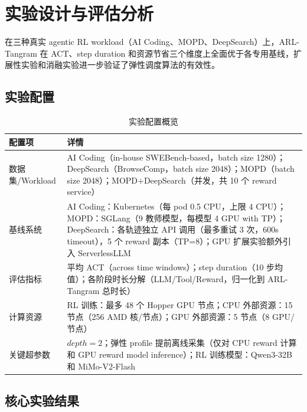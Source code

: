 \documentclass[11pt, a4paper]{article}
\begin{document}
\section{实验设计与评估分析}

\begin{keyinsight}[TL;DR]
在三种真实 agentic RL workload（AI Coding、MOPD、DeepSearch）上，ARL-Tangram 在 ACT、step duration 和资源节省三个维度上全面优于各专用基线，扩展性实验和消融实验进一步验证了弹性调度算法的有效性。
\end{keyinsight}

\subsection{实验配置}

\begin{table}[htbp]
\centering
\caption{实验配置概览}
\label{tab:expsetup}
\begin{tabular}{p{3.0cm}p{10.0cm}}
\toprule
\textbf{配置项} & \textbf{详情} \\
\midrule
数据集/Workload & AI Coding（in-house SWEBench-based，batch size 1280）；DeepSearch（BrowseComp，batch size 2048）；MOPD（batch size 2048）；MOPD+DeepSearch（并发，共 10 个 reward service） \\
基线系统 & AI Coding：Kubernetes（每 pod 0.5 CPU，上限 4 CPU）；MOPD：SGLang（9 教师模型，每模型 4 GPU with TP）；DeepSearch：各轨迹独立 API 调用（最多重试 3 次，600s timeout），5 个 reward 副本（TP=8）；GPU 扩展实验额外引入 ServerlessLLM \\
评估指标 & 平均 ACT（across time windows）；step duration（10 步均值）；各阶段时长分解（LLM/Tool/Reward，归一化到 ARL-Tangram 总时长） \\
计算资源 & RL 训练：最多 48 个 Hopper GPU 节点；CPU 外部资源：15 节点（256 AMD 核/节点）；GPU 外部资源：5 节点（8 GPU/节点） \\
关键超参数 & $\mathit{depth} = 2$；弹性 profile 提前离线采集（仅对 CPU reward 计算和 GPU reward model inference）；RL 训练模型：Qwen3-32B 和 MiMo-V2-Flash \\
\bottomrule
\end{tabular}
\end{table}

\subsection{核心实验结果}
\end{document}
